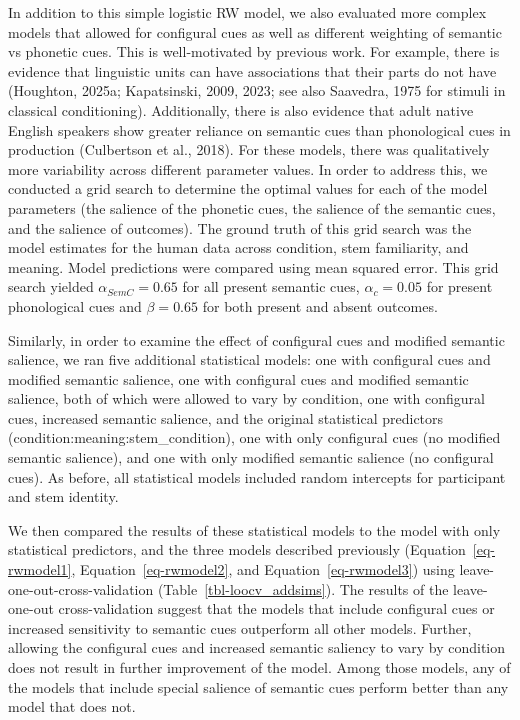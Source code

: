 \documentclass[
  letterpaper,
  DIV=11,
  numbers=noendperiod]{scrartcl}
\begin{document}
In addition to this simple logistic RW model, we also evaluated more
complex models that allowed for configural cues as well as different
weighting of semantic vs phonetic cues. This is well-motivated by
previous work. For example, there is evidence that linguistic units can
have associations that their parts do not have (Houghton, 2025a;
Kapatsinski, 2009, 2023; see also Saavedra, 1975 for stimuli in
classical conditioning). Additionally, there is also evidence that adult
native English speakers show greater reliance on semantic cues than
phonological cues in production (Culbertson et al., 2018). For these
models, there was qualitatively more variability across different
parameter values. In order to address this, we conducted a grid search
to determine the optimal values for each of the model parameters (the
salience of the phonetic cues, the salience of the semantic cues, and
the salience of outcomes). The ground truth of this grid search was the
model estimates for the human data across condition, stem familiarity,
and meaning. Model predictions were compared using mean squared error.
This grid search yielded \(\alpha_{SemC}=0.65\) for all present semantic
cues, \(\alpha_c=0.05\) for present phonological cues and \(\beta=0.65\)
for both present and absent outcomes.

Similarly, in order to examine the effect of configural cues and
modified semantic salience, we ran five additional statistical models:
one with configural cues and modified semantic salience, one with
configural cues and modified semantic salience, both of which were
allowed to vary by condition, one with configural cues, increased
semantic salience, and the original statistical predictors
(condition:meaning:stem\_condition), one with only configural cues (no
modified semantic salience), and one with only modified semantic
salience (no configural cues). As before, all statistical models
included random intercepts for participant and stem identity.

We then compared the results of these statistical models to the model
with only statistical predictors, and the three models described
previously (Equation~\ref{eq-rwmodel1}, Equation~\ref{eq-rwmodel2}, and
Equation~\ref{eq-rwmodel3}) using leave-one-out-cross-validation
(Table~\ref{tbl-loocv_addsims}). The results of the leave-one-out
cross-validation suggest that the models that include configural cues or
increased sensitivity to semantic cues outperform all other models.
Further, allowing the configural cues and increased semantic saliency to
vary by condition does not result in further improvement of the model.
Among those models, any of the models that include special salience of
semantic cues perform better than any model that does not.
\end{document}
